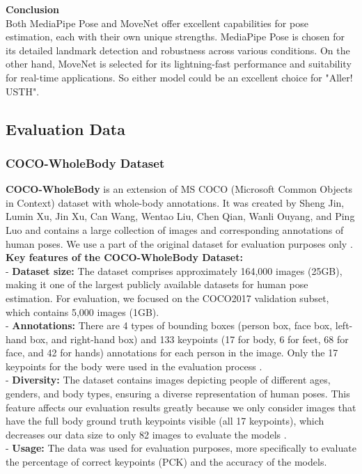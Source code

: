 \documentclass[12pt]{article}
\begin{document}
\textbf{Conclusion}\\[5pt]
Both MediaPipe Pose and MoveNet offer excellent capabilities for pose estimation, each with their own unique strengths.
MediaPipe Pose is chosen for its detailed landmark detection and robustness across various conditions. On the other hand, MoveNet is selected for its lightning-fast performance and suitability for real-time applications.
So either model could be an excellent choice for "Aller! USTH".

\subsection{Evaluation Data}
\subsubsection{COCO-WholeBody Dataset}
\textbf{COCO-WholeBody} is an extension of MS COCO (Microsoft Common Objects in Context) dataset with whole-body annotations. It was created by Sheng Jin, Lumin Xu, Jin Xu, Can Wang, Wentao Liu, Chen Qian, Wanli Ouyang, and Ping Luo and contains a large collection of images and corresponding annotations of human poses. We use a part of the original dataset for evaluation purposes only \cite{jin2020arxiv}.\\

\textbf{Key features of the COCO-WholeBody Dataset:}\\[5pt]
\hspace*{1.5em}- \textbf{Dataset size:} The dataset comprises approximately 164,000 images (25GB), making it one of the largest publicly available datasets for human pose estimation. For evaluation, we focused on the COCO2017 validation subset, which contains 5,000 images (1GB).\\[5pt]
\hspace*{1.5em}- \textbf{Annotations:} There are 4 types of bounding boxes (person box, face box, left-hand box, and right-hand box) and 133 keypoints (17 for body, 6 for feet, 68 for face, and 42 for hands) annotations for each person in the image. Only the 17 keypoints for the body were used in the evaluation process \cite{jin2020arxiv}.\\[5pt]
\hspace*{1.5em}- \textbf{Diversity:} The dataset contains images depicting people of different ages, genders, and body types, ensuring a diverse representation of human poses. This feature affects our evaluation results greatly because we only consider images that have the full body ground truth keypoints visible (all 17 keypoints), which decreases our data size to only 82 images to evaluate the models \cite{jin2020arxiv}.\\[5pt]
\hspace*{1.5em}- \textbf{Usage:} The data was used for evaluation purposes, more specifically to evaluate the percentage of correct keypoints (PCK) and the accuracy of the models.\\
\end{document}
